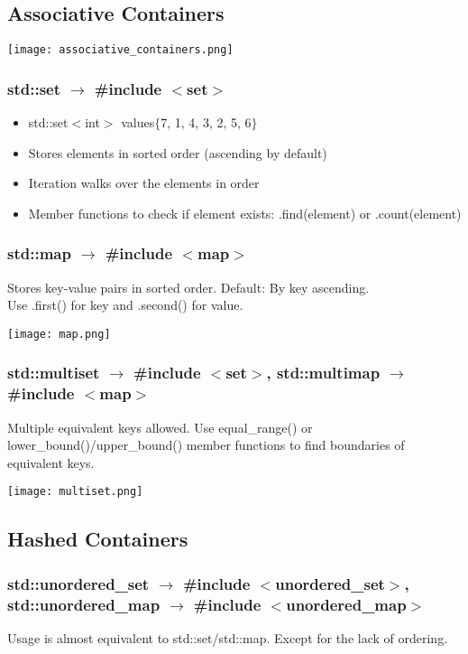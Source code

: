 \subsection{Associative Containers}
\begin{center}
    \texttt{[image: associative\_containers.png]}
\end{center}
\subsubsection{std::set $\rightarrow$ \#include $<$set$>$}
\begin{itemize}
    \item std::set$<$int$>$ values$\{$7, 1, 4, 3, 2, 5, 6$\}$
    \item Stores elements in sorted order (ascending by default)
    \item Iteration walks over the elements in order
    \item Member functions to check if element exists: .find(element) or .count(element)
\end{itemize}
\subsubsection{std::map $\rightarrow$ \#include $<$map$>$}
Stores key-value pairs in sorted order. Default: By key ascending.\\
Use .first() for key and .second() for value.
\begin{center}
    \texttt{[image: map.png]}
\end{center}
\subsubsection{std::multiset $\rightarrow$ \#include $<$set$>$, std::multimap $\rightarrow $\#include $<$map$>$}
Multiple equivalent keys allowed. Use equal\_range() or lower\_bound()/upper\_bound() member functions to find boundaries of equivalent keys.
\begin{center}
    \texttt{[image: multiset.png]}
\end{center}
\subsection{Hashed Containers}
\subsubsection{std::unordered\_set $\rightarrow$ \#include $<$unordered\_set$>$, std::unordered\_map $\rightarrow$ \#include $<$unordered\_map$>$}
Usage is almost equivalent to std::set/std::map. Except for the lack of ordering.

